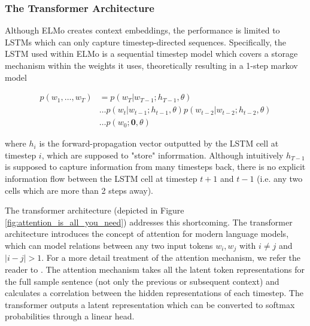 \documentclass[a4paper,12pt,twoside,openright]{report}
\begin{document}
\subsubsection{The Transformer Architecture}

Although ELMo creates context embeddings, the performance is limited to LSTMs which can only capture timestep-directed sequences.
Specifically, the LSTM used within ELMo is a sequential timestep model which covers a storage mechanism within the weights it uses, theoretically resulting in a 1-step markov model

\begin{align}
p(w_1, \ldots, w_T) &= p(w_T | w_{T-1}; h_{T-1}, \theta) \nonumber  \\
& \ldots p(w_t | w_{t-1}; h_{t-1}, \theta) p(w_{t-2} | w_{t-2}; h_{t-2}, \theta) \nonumber \\
& \ldots p(w_0 ; \mathbf{0}, \theta) 
\end{align}

where $h_{i}$ is the forward-propagation vector outputted by the LSTM cell at timestep $i$, which are supposed to "store" inforrmation.
Although intuitively $h_{T-1}$ is supposed to capture information from many timesteps back, there is no explicit information flow between the LSTM cell at timestep $t+1$ and $t-1$ (i.e. any two cells which are more than 2 steps away).

The transformer architecture \cite{vaswani17} (depicted in Figure \ref{fig:attention_is_all_you_need}) addresses this shortcoming.
The transformer architecture introduces the concept of attention for modern language models, which can model relations between any two input tokens $w_i, w_j$ with $i \neq j$ and $| i - j |  > 1$.
For a more detail treatment of the attention mechanism, we refer the reader to \cite{bahdanau16}.
The attention mechanism takes all the latent token representations for the full sample sentence (not only the previous or subsequent context) and calculates a correlation between the hidden representations of each timestep.
The transformer outputs a latent representation which can be converted to softmax probabilities through a linear head.
\end{document}
